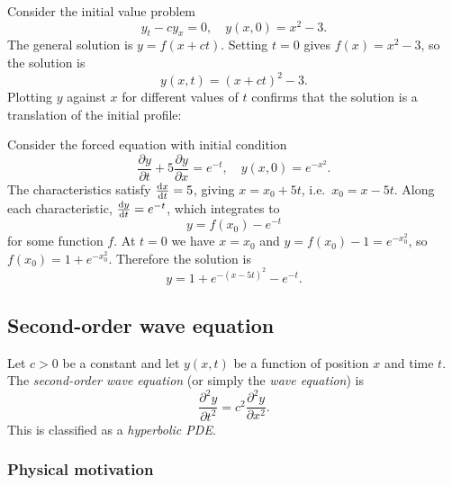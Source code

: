 \documentclass[a4paper]{article}
\begin{document}
\begin{eg}
  Consider the initial value problem
  \[
    y_t - cy_x = 0, \quad y(x, 0) = x^2 - 3.
  \]
  The general solution is $y = f(x + ct)$. Setting $t = 0$ gives $f(x) = x^2 - 3$, so the solution is
  \[
    y(x, t) = (x + ct)^2 - 3.
  \]
  Plotting $y$ against $x$ for different values of $t$ confirms that the solution is a translation of the initial profile:
  \begin{center}
  \end{center}
\end{eg}

\begin{eg}
  Consider the forced equation with initial condition
  \[
    \frac{\partial y}{\partial t} + 5\frac{\partial y}{\partial x} = e^{-t}, \quad y(x, 0) = e^{-x^2}.
  \]
  The characteristics satisfy $\frac{\mathrm{d} x}{\mathrm{d} t} = 5$, giving $x = x_0 + 5t$, i.e.\ $x_0 = x - 5t$. Along each characteristic, $\frac{\mathrm{d} y}{\mathrm{d} t} = e^{-t}$, which integrates to
  \[
    y = f(x_0) - e^{-t}
  \]
  for some function $f$. At $t = 0$ we have $x = x_0$ and $y = f(x_0) - 1 = e^{-x_0^2}$, so $f(x_0) = 1 + e^{-x_0^2}$. Therefore the solution is
  \[
    y = 1 + e^{-(x - 5t)^2} - e^{-t}.
  \]
\end{eg}
\subsection{Second-order wave equation}

\begin{defi}
  Let $c > 0$ be a constant and let $y(x, t)$ be a function of position $x$ and time $t$. The \emph{second-order wave equation} (or simply the \emph{wave equation}) is
  \[
    \frac{\partial ^2 y}{\partial t^2} = c^2 \frac{\partial^2 y}{\partial x^2}.
  \]
  This is classified as a \emph{hyperbolic PDE}.
\end{defi}

\subsubsection*{Physical motivation}
\end{document}
